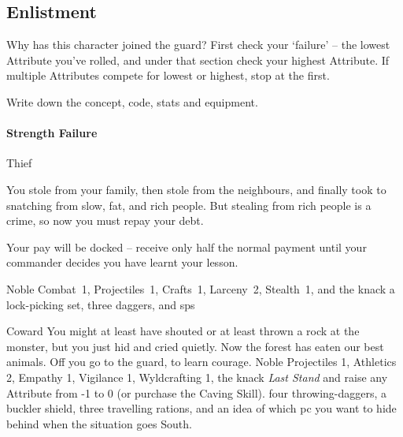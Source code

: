 \begin{multicols}{2}

\subsection{Enlistment}
\label{enlistment}

Why has this character joined the \gls{guard}?
First check your `failure' -- the lowest Attribute you've rolled, and under that section check your highest Attribute.
If multiple Attributes compete for lowest or highest, stop at the first.

Write down the concept, code, stats and equipment.

\begin{figure*}[b!]
  \commonArmourChart
\end{figure*}

\paragraph{Strength Failure}

\begin{itemize}

    {Thief}%
    {
      You stole from your family, then stole from the neighbours, and finally took to snatching from slow, fat, and rich people.
      But stealing from rich people is a crime, so now you must repay your debt.

      Your pay will be docked -- receive only half the normal payment until your commander decides you have learnt your lesson.

    }%
    {Noble}%
    {Combat~1, Projectiles~1, Crafts~1, Larceny~2, Stealth~1, and the knack }%
    {a lock-picking set, three daggers, and  \glspl{sp}}%

    {Coward}%
    {
      You might at least have shouted or at least thrown a rock at the monster, but you just hid and cried quietly.
      Now the forest has eaten our best animals.
      Off you go to the \gls{guard}, to learn courage.
    }%
    {Noble}%
    {
      Projectiles 1, Athletics 2, Empathy 1, Vigilance 1, Wyldcrafting 1, the knack \textit{Last Stand} and raise any Attribute from -1 to 0 (or purchase the Caving Skill).
    }%
    {
      four throwing-daggers, a buckler shield, three travelling rations, and an idea of which \gls{pc} you want to hide behind when the situation goes South.
    }%



\end{itemize}
\end{multicols}
